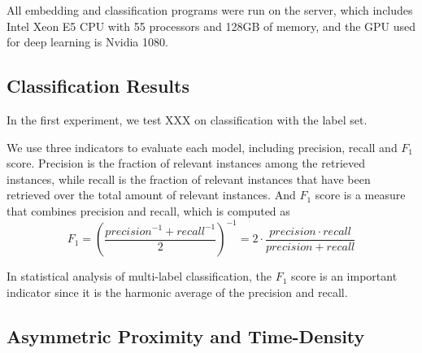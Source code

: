 All embedding and classification programs were run on the server, which includes Intel Xeon E5 CPU with 55 processors and 128GB of memory, and the GPU used for deep learning is Nvidia 1080.

\subsection{Classification Results}
In the first experiment, we test XXX on classification with the label set. 

We use three indicators to evaluate each model, including precision, recall and $F_1$ score. Precision is the fraction of relevant instances among the retrieved instances, while recall is the fraction of relevant instances that have been retrieved over the total amount of relevant instances. And $F_1$ score is a measure that combines precision and recall, which is computed as
\begin{equation}
F_1=(\frac{{precision}^{-1}+{recall}^{-1}}{2})^{-1}=2\cdot\frac{precision \cdot recall}{precision + recall}
\end{equation}

In statistical analysis of multi-label classification, the $F_1$ score is an important indicator since it is the harmonic average of the precision and recall.

\subsection{Asymmetric Proximity and Time-Density}


